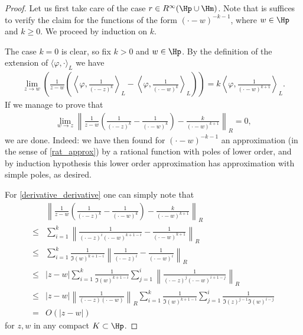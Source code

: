 \begin{proof}
	Let us first take care of the case $r \in R^{\infty}(\Hp \cup \Hm)$. Note that is suffices to verify the claim for the functions of the form $(\cdot - w)^{-k - 1}$, where $w \in \Hp$ and $k \geq 0$. We proceed by induction on $k$.

	The case $k = 0$ is clear, so fix $k > 0$ and $w \in \Hp$. By the definition of the extension of $\langle \varphi, \cdot\rangle_{L}$ we have
	\begin{align*}
		\lim_{z \to w}\left(\frac{1}{z - w} \left(\left\langle \varphi, \frac{1}{(\cdot - z)^{k}}\right\rangle_{L} - \left\langle \varphi, \frac{1}{(\cdot - w)^{k}}\right\rangle_{L}\right)\right) = k \left\langle \varphi, \frac{1}{(\cdot - w)^{k + 1}}\right\rangle_{L}.
	\end{align*}
	If we manage to prove that
	\begin{align}\label{derivative_derivative}
		\lim_{w \to z} \left\| \frac{1}{z - w}\left(\frac{1}{(\cdot - z)^{k}} - \frac{1}{(\cdot - w)^{k}}\right) - \frac{k}{(\cdot - w)^{k + 1}}\right\|_{R} = 0,
	\end{align}
	we are done. Indeed: we have then found for $(\cdot - w)^{-k - 1}$ an approximation (in the sense of \ref{rat_approx}) by a rational function with poles of lower order, and by induction hypothesis this lower order approximation has approximation with simple poles, as desired.

	For \ref{derivative_derivative} one can simply note that
	\begin{align*}
		& \left\| \frac{1}{z - w}\left(\frac{1}{(\cdot - z)^{k}} - \frac{1}{(\cdot - w)^{k}}\right) - \frac{k}{(\cdot - w)^{k + 1}}\right\|_{R} \\
		\leq & \sum_{i = 1}^{k} \left\|\frac{1}{(\cdot - z)^{i} (\cdot - w)^{k + 1 - i}} - \frac{1}{(\cdot - w)^{k + 1}}\right\|_{R} \\
		\leq & \sum_{i = 1}^{k} \frac{1}{\Im(w)^{k + 1 - i}}\left\|\frac{1}{(\cdot - z)^{i}} - \frac{1}{(\cdot - w)^{i}}\right\|_{R} \\
		\leq & |z - w|\sum_{i = 1}^{k} \frac{1}{\Im(w)^{k + 1 - i}} \sum_{j = 1}^{i} \left\|\frac{1}{(\cdot - z)^{j} (\cdot - w)^{i + 1 - j}}\right\|_{R} \\
		\leq & |z - w| \left\|\frac{1}{(\cdot - z)(\cdot - w)}\right\|_{R}\sum_{i = 1}^{k} \frac{1}{\Im(w)^{k + 1 - i}} \sum_{j = 1}^{i} \frac{1}{\Im(z)^{j - 1} \Im(w)^{i - j}} \\
		= & O(|z - w|)
	\end{align*}
	for $z, w$ in any compact $K \subset \Hp$.


\end{proof}
